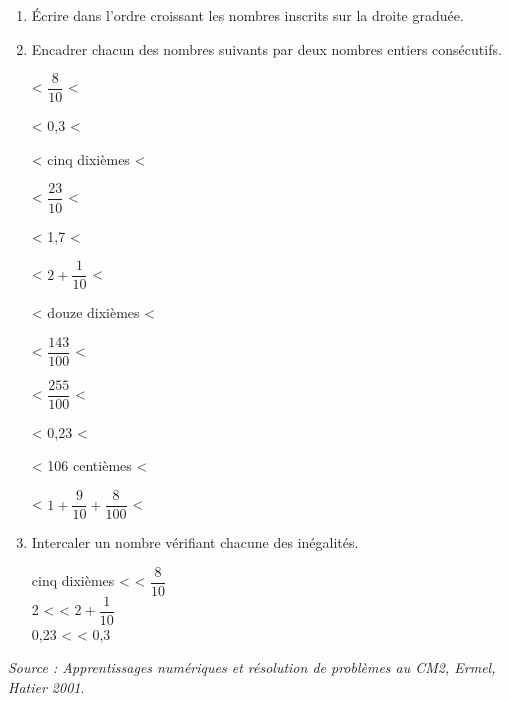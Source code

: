 \begin{activite}
\begin{QCM}
         \begin{enumerate}
            \item Écrire dans l'ordre croissant les nombres inscrits sur la droite graduée. \par \medskip            
               \pointilles \medskip
            \item Encadrer chacun des nombres suivants par deux nombres entiers consécutifs.
             \setlength{\columnsep}{1cm}           
             \begin{multicols}{3}  
                \pointilles{} < $\dfrac{8}{10}$ < \pointilles \par\bigskip
                \pointilles{} < 0,3 < \pointilles \par\medskip
                \pointilles{} < {\small cinq dixièmes} < \pointilles \par\bigskip
                \pointilles{} < $\dfrac{23}{10}$ < \pointilles \par\bigskip
                \pointilles{} < 1,7 < \pointilles \par\medskip
                \pointilles{} < $2+\dfrac{1}{10}$ < \pointilles \par\bigskip
                \pointilles{} < {\small douze dixièmes} < \pointilles \par\bigskip
                \pointilles{} < $\dfrac{143}{100}$ < \pointilles \par\bigskip
                \pointilles{} < $\dfrac{255}{100}$ < \pointilles \par\bigskip
                \pointilles{} < 0,23 < \pointilles \par\medskip
                \pointilles{} < {\small 106 centièmes} < \pointilles \par\bigskip
                \pointilles{} < $1+\dfrac{9}{10}+\dfrac{8}{100}$ < \pointilles
            \end{multicols}
            \item Intercaler un nombre vérifiant chacune des inégalités.
            \setlength{\columnsep}{1.5cm}
             \begin{multicols}{3}
                {\small cinq dixièmes} < \pointilles{} < $\dfrac{8}{10}$ \\
                2 < \pointilles{} < $2+\dfrac{1}{10}$ \\
                0,23 < \pointilles{} < 0,3
            \end{multicols}
         \end{enumerate}
      \vspace*{-3mm}
   \end{QCM}
   \vfill\hfill{\it\footnotesize Source : Apprentissages numériques et résolution de problèmes au CM2, Ermel, Hatier 2001}.
\end{activite}


